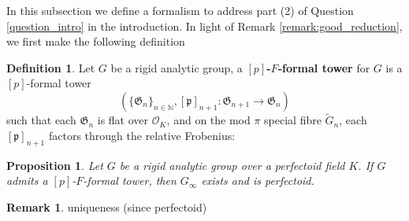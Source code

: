 \documentclass[10pt,oneside]{amsart}
\newtheorem{proposition}[theorem]{Proposition}
\theoremstyle{definition}
\newtheorem{definition}[theorem]{Definition}
\newtheorem{remark}[theorem]{Remark}
\begin{document}
In this subsection we define a formalism to address part (2) of Question \ref{question_intro} in the introduction. In light of Remark \ref{remark:good_reduction}, we first make the following definition
	
	\begin{definition}
		Let $G$ be a rigid analytic group, a \textbf{$[p]$-$F$-formal tower} for $G$ is a $[p]$-formal tower 
		$$(\{\mathfrak G_n\}_{n\in \mathbb N}, [\mathfrak p]_{n+1}:\mathfrak G_{n+1}\rightarrow \mathfrak G_{n})$$ such that each $\mathfrak G_n$ is flat over $\mathcal O_K$, and on the mod $\pi$ special fibre  $\tilde{G}_n$, each   $[\mathfrak p]_{n+1}$ factors through the relative Frobenius:
				\begin{center}
				\end{center}
	 
	\end{definition}	
	
	 	\begin{proposition}\label{existence of p-F-formal tower implies perfectoid}
		Let $G$ be a rigid analytic group over a perfectoid field $K$. If $G$ admits a $[p]$-$F$-formal tower, then $G_\infty$ exists and is perfectoid. 
	\end{proposition}
	 
	\begin{remark}
	uniqueness (since perfectoid)
	\end{remark} 
	 
\end{document}
